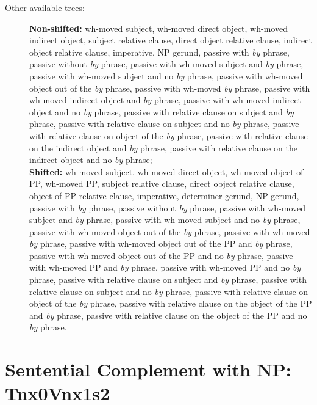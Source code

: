 \begin{description}
\item[Other available trees:] 
{\bf Non-shifted:}  wh-moved subject, wh-moved direct object, 
wh-moved indirect object, subject relative clause, direct object relative
clause, indirect object relative clause, imperative, NP
gerund, passive with {\it by} phrase, passive without {\it by} phrase, passive
with wh-moved subject and {\it by} phrase, passive with wh-moved subject and no
{\it by} phrase, passive with wh-moved object out of the {\it by} phrase,
passive with wh-moved {\it by} phrase, passive with wh-moved indirect object
and {\it by} phrase, passive with wh-moved indirect object and no {\it by}
phrase,  passive with relative clause on subject and {\it by} phrase, passive
with relative clause on subject and no {\it by} phrase, passive with relative
clause on object of the {\it by} phrase, passive with relative clause on the
indirect object and {\it by} phrase, passive with relative clause on the
indirect object and no {\it by} phrase; \\
{\bf Shifted:} wh-moved subject, wh-moved direct object, 
wh-moved object of PP, wh-moved PP, subject relative clause, direct object
relative clause, object of PP relative clause, imperative, determiner gerund,
NP gerund, passive with {\it by} phrase, passive without {\it by} phrase,
passive with wh-moved subject and {\it by} phrase, passive with wh-moved
subject and no {\it by} phrase, passive with wh-moved object out of the {\it
by} phrase, passive with wh-moved {\it by} phrase, passive with wh-moved object
out of the PP and {\it by} phrase, passive with wh-moved object out of the PP
and no {\it by} phrase, passive with wh-moved PP and {\it by} phrase, passive
with wh-moved PP and no {\it by} phrase, passive with relative clause on
subject and {\it by} phrase, passive with relative clause on subject and no
{\it by} phrase, passive with relative clause on object of the {\it by} phrase,
passive with relative clause on the object of the PP and {\it by} phrase,
passive with relative clause on the object of the PP and no {\it by} phrase.


\end{description}




\section{Sentential Complement with NP: Tnx0Vnx1s2} 
\label{nx0Vnx1s2-family}

